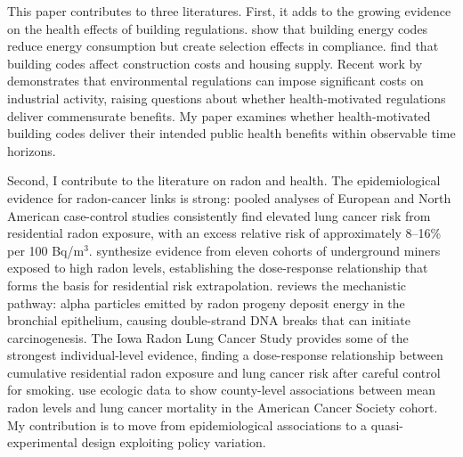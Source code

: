 \documentclass[12pt]{article}
\begin{document}
This paper contributes to three literatures. First, it adds to the growing evidence on the health effects of building regulations. \citet{ito2021selection} show that building energy codes reduce energy consumption but create selection effects in compliance. \citet{levitt2006impact} find that building codes affect construction costs and housing supply. Recent work by \citet{greenstone2002impact} demonstrates that environmental regulations can impose significant costs on industrial activity, raising questions about whether health-motivated regulations deliver commensurate benefits. My paper examines whether health-motivated building codes deliver their intended public health benefits within observable time horizons.

Second, I contribute to the literature on radon and health. The epidemiological evidence for radon-cancer links is strong: pooled analyses of European \citep{darby2005radon} and North American \citep{krewski2005residential} case-control studies consistently find elevated lung cancer risk from residential radon exposure, with an excess relative risk of approximately 8--16\% per 100 Bq/m$^3$. \citet{lubin2004radon} synthesize evidence from eleven cohorts of underground miners exposed to high radon levels, establishing the dose-response relationship that forms the basis for residential risk extrapolation. \citet{samet2009radon} reviews the mechanistic pathway: alpha particles emitted by radon progeny deposit energy in the bronchial epithelium, causing double-strand DNA breaks that can initiate carcinogenesis. The Iowa Radon Lung Cancer Study \citep{field2000residential} provides some of the strongest individual-level evidence, finding a dose-response relationship between cumulative residential radon exposure and lung cancer risk after careful control for smoking. \citet{turner2011radon} use ecologic data to show county-level associations between mean radon levels and lung cancer mortality in the American Cancer Society cohort. My contribution is to move from epidemiological associations to a quasi-experimental design exploiting policy variation.
\end{document}
